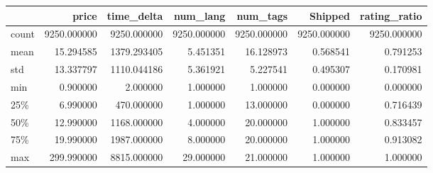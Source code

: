 \begin{tabular}{lrrrrrr}
\toprule
{} &        price &   time\_delta &     num\_lang &     num\_tags &      Shipped &  rating\_ratio \\
\midrule
count &  9250.000000 &  9250.000000 &  9250.000000 &  9250.000000 &  9250.000000 &   9250.000000 \\
mean  &    15.294585 &  1379.293405 &     5.451351 &    16.128973 &     0.568541 &      0.791253 \\
std   &    13.337797 &  1110.044186 &     5.361921 &     5.227541 &     0.495307 &      0.170981 \\
min   &     0.900000 &     2.000000 &     1.000000 &     1.000000 &     0.000000 &      0.000000 \\
25\%   &     6.990000 &   470.000000 &     1.000000 &    13.000000 &     0.000000 &      0.716439 \\
50\%   &    12.990000 &  1168.000000 &     4.000000 &    20.000000 &     1.000000 &      0.833457 \\
75\%   &    19.990000 &  1987.000000 &     8.000000 &    20.000000 &     1.000000 &      0.913082 \\
max   &   299.990000 &  8815.000000 &    29.000000 &    21.000000 &     1.000000 &      1.000000 \\
\bottomrule
\end{tabular}
